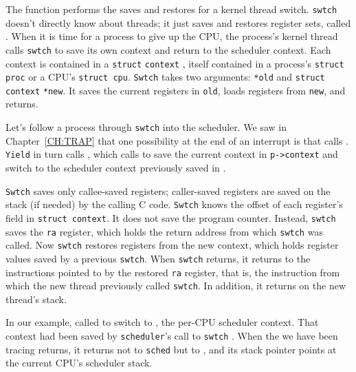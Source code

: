 The function
performs the saves and restores for a kernel thread switch.
\lstinline{swtch}
doesn't directly know about threads; it just saves and
restores register sets, called 
.
When it is time for a process to give up the CPU,
the process's kernel thread calls
\lstinline{swtch}
to save its own context and return to the scheduler context.
Each context is contained in a
\lstinline{struct}
\lstinline{context}
,
itself contained in a process's
\lstinline{struct proc}
or a CPU's
\lstinline{struct cpu}.
\lstinline{Swtch}
takes two arguments:
\lstinline{*old}
and
\lstinline{struct}
\lstinline{context}
\lstinline{*new}.
It saves the current registers in
\lstinline{old},
loads registers from 
\lstinline{new},
and returns.

Let's follow a process through
\lstinline{swtch} 
into the scheduler.
We saw in Chapter~\ref{CH:TRAP}
that one possibility at the end of an interrupt is that 
calls 
.
\lstinline{Yield}
in turn calls
,
which calls
to save the current context in
\lstinline{p->context}
and switch to the scheduler context previously saved in 
.

\lstinline{Swtch}
saves only callee-saved registers;
caller-saved registers are saved on the stack (if needed) by the
calling C code.
\lstinline{Swtch} knows the offset of each
register's field in 
\lstinline{struct context}.
It does not save the program counter.
Instead,
\lstinline{swtch}
saves the
\lstinline{ra} register,
which holds the return address from which
\lstinline{swtch}
was called.
Now
\lstinline{swtch}
restores registers from the new context,
which holds register values saved by a previous
\lstinline{swtch}.
When 
\lstinline{swtch}
returns, it returns to the instructions pointed to
by the restored
\lstinline{ra}
register, that is,
the instruction from which the new thread previously
called \lstinline{swtch}.
In addition, it returns on the new thread's stack.

In our example, 
called
to switch to
,
the per-CPU scheduler context.
That context had been saved by 
\lstinline{scheduler}'s
call to
\lstinline{swtch}
.
When the
we have been tracing returns,
it returns not to
\lstinline{sched}
but to 
,
and its stack pointer points at the current CPU's
scheduler stack.
